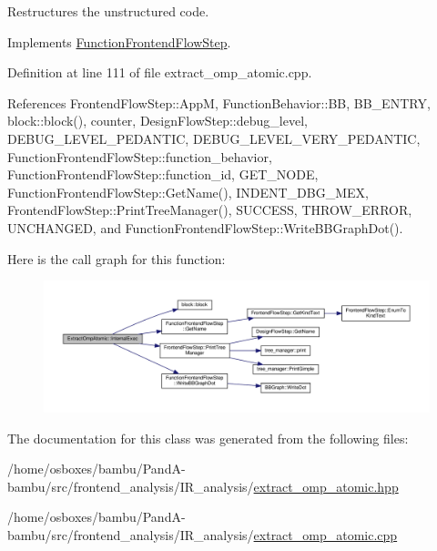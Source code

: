 Restructures the unstructured code. 



Implements \hyperlink{classFunctionFrontendFlowStep_a00612f7fb9eabbbc8ee7e39d34e5ac68}{Function\+Frontend\+Flow\+Step}.



Definition at line 111 of file extract\+\_\+omp\+\_\+atomic.\+cpp.



References Frontend\+Flow\+Step\+::\+AppM, Function\+Behavior\+::\+BB, B\+B\+\_\+\+E\+N\+T\+RY, block\+::block(), counter, Design\+Flow\+Step\+::debug\+\_\+level, D\+E\+B\+U\+G\+\_\+\+L\+E\+V\+E\+L\+\_\+\+P\+E\+D\+A\+N\+T\+IC, D\+E\+B\+U\+G\+\_\+\+L\+E\+V\+E\+L\+\_\+\+V\+E\+R\+Y\+\_\+\+P\+E\+D\+A\+N\+T\+IC, Function\+Frontend\+Flow\+Step\+::function\+\_\+behavior, Function\+Frontend\+Flow\+Step\+::function\+\_\+id, G\+E\+T\+\_\+\+N\+O\+DE, Function\+Frontend\+Flow\+Step\+::\+Get\+Name(), I\+N\+D\+E\+N\+T\+\_\+\+D\+B\+G\+\_\+\+M\+EX, Frontend\+Flow\+Step\+::\+Print\+Tree\+Manager(), S\+U\+C\+C\+E\+SS, T\+H\+R\+O\+W\+\_\+\+E\+R\+R\+OR, U\+N\+C\+H\+A\+N\+G\+ED, and Function\+Frontend\+Flow\+Step\+::\+Write\+B\+B\+Graph\+Dot().

Here is the call graph for this function\+:
\nopagebreak
\begin{figure}[H]
\begin{center}
\leavevmode
\includegraphics[width=350pt]{d6/df2/classExtractOmpAtomic_a15be85728c9e9cbfe5db4c754e196782_cgraph}
\end{center}
\end{figure}


The documentation for this class was generated from the following files\+:\begin{DoxyCompactItemize}
\item 
/home/osboxes/bambu/\+Pand\+A-\/bambu/src/frontend\+\_\+analysis/\+I\+R\+\_\+analysis/\hyperlink{extract__omp__atomic_8hpp}{extract\+\_\+omp\+\_\+atomic.\+hpp}\item 
/home/osboxes/bambu/\+Pand\+A-\/bambu/src/frontend\+\_\+analysis/\+I\+R\+\_\+analysis/\hyperlink{extract__omp__atomic_8cpp}{extract\+\_\+omp\+\_\+atomic.\+cpp}\end{DoxyCompactItemize}
